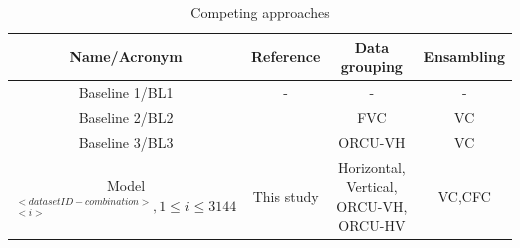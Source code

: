 \begin{table}[h] 
	\centering \caption{Competing approaches} 
	\begin{tabular}{|c|c|c|c|}\hline
		\textbf{Name/Acronym} & \textbf{Reference} & \textbf{Data grouping} & \textbf{Ensambling} \\\hline
		Baseline 1/BL1 & - & - & - \\\hline
		Baseline 2/BL2 & \cite{mehedy-masud:2017:fvc} & FVC & VC \\\hline
		Baseline 3/BL3 & \cite{mehedy-masud:2018:frmwrk} & ORCU-VH & VC \\\hline
		Model$_{<i>}^{<datasetID-combination>}, 1\leq i \leq 3144$ & This study & Horizontal, Vertical, ORCU-VH, ORCU-HV & VC,CFC \\\hline 
	\end{tabular}
	\label{t:competingmodels}
\end{table}
